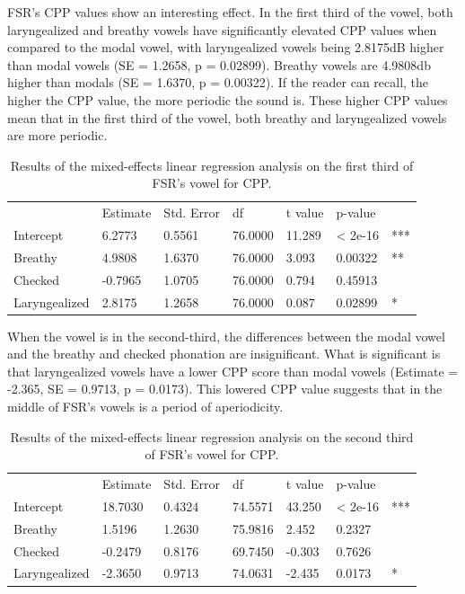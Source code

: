 \documentclass[12pt, letterpaper]{article}
\providecommand{\lsptoprule}{\midrule\toprule}
\providecommand{\lspbottomrule}{\bottomrule\midrule}
\begin{document}
FSR's CPP values show an interesting effect. In the first third of the vowel, both laryngealized and breathy vowels have significantly elevated CPP values when compared to the modal vowel, with laryngealized vowels being 2.8175dB higher than 
modal vowels (SE = 1.2658, p = 0.02899). Breathy vowels are 4.9808db higher than modals (SE = 1.6370, p = 0.00322). If the reader can recall, the higher the CPP value, the more periodic the sound is. These higher CPP values mean that in the first third of the vowel, both breathy and laryngealized vowels are more periodic. 
\begin{table}[!h]
    \centering
    \caption{Results of the mixed-effects linear regression analysis on the first third of FSR's vowel for CPP. }
    \label{tab:FSR_CPP_First}
    \begin{tabular}{lllllll}
	\lsptoprule
					&  Estimate  & Std. Error & df & t value & p-value & \\
        Intercept       &  6.2773  & 0.5561 & 76.0000 & 11.289  & < 2e-16 & *** \\  
  	Breathy   		&  4.9808  & 1.6370 & 76.0000 & 3.093  & 0.00322  & **\\
	Checked    		& -0.7965  & 1.0705 & 76.0000 & 0.794  & 0.45913  & \\
	Laryngealized	&  2.8175  & 1.2658 & 76.0000 & 0.087  & 0.02899  & *\\
        \lspbottomrule
    \end{tabular}
\end{table}

When the vowel is in the second-third, the differences between the modal vowel and the breathy and checked phonation are insignificant. What is significant is that laryngealized vowels have a lower CPP score than modal vowels (Estimate = -2.365, SE = 0.9713, p = 0.0173). This lowered CPP value suggests that in the middle of FSR's vowels is a period of aperiodicity. 
\begin{table}[!h]
    \centering
    \caption{Results of the mixed-effects linear regression analysis on the second third of FSR's vowel for CPP. }
    \label{tab:FSR_CPP_Second}
    \begin{tabular}{lllllll}
	\lsptoprule
					&  Estimate  & Std. Error & df & t value & p-value & \\
        Intercept       & 18.7030  & 0.4324 & 74.5571 & 43.250  & < 2e-16  & *** \\  
  	Breathy   		&  1.5196  & 1.2630 & 75.9816 &  2.452  & 0.2327   & \\
	Checked    		& -0.2479  & 0.8176 & 69.7450 & -0.303  & 0.7626   & \\
	Laryngealized	& -2.3650  & 0.9713 & 74.0631 & -2.435  & 0.0173   & * \\
        \lspbottomrule
    \end{tabular}
\end{table}
\end{document}
